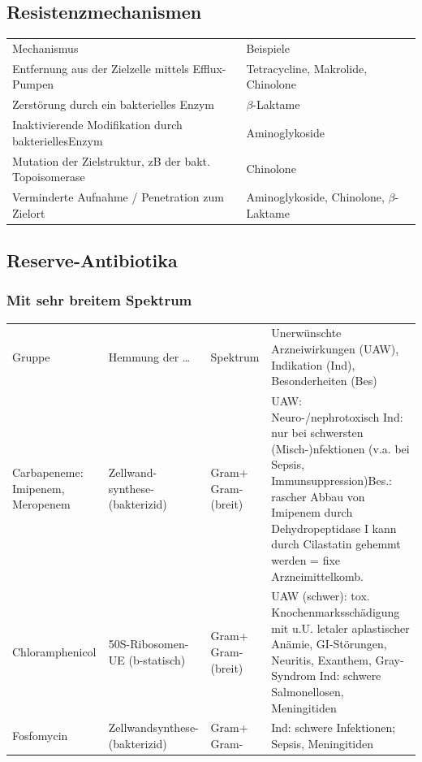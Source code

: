 \documentclass[10pt,a4paper]{report}
\begin{document}
\subsection{Resistenzmechanismen} %
\label{sub:subsection_name}
\begin{tabularx}{\textwidth}{lX}
Mechanismus&Beispiele\\
Entfernung aus der Zielzelle mittels Efflux-Pumpen&Tetracycline, Makrolide, Chinolone\\
Zerstörung durch ein bakterielles Enzym&$\beta$-Laktame\\
Inaktivierende Modifikation durch bakteriellesEnzym&Aminoglykoside\\
Mutation der Zielstruktur, zB der bakt. Topoisomerase&Chinolone\\
Verminderte Aufnahme / Penetration zum Zielort&Aminoglykoside, Chinolone, $\beta$-Laktame\\
\end{tabularx}
\subsection{Reserve-Antibiotika} %
\label{sub:reserve_antibiotika}
\subsubsection{Mit sehr breitem Spektrum} %
\label{ssub:mit_sehr_breitem_spektrum}
\begin{tabularx}{\textwidth}{XXlX}
Gruppe&Hemmung der …&Spektrum&Unerwünschte Arzneiwirkungen (UAW), Indikation (Ind), Besonderheiten (Bes) \\
Carbapeneme: Imipenem, Meropenem&Zellwand-synthese-(bakterizid)&Gram+ Gram-(breit)&UAW: Neuro-/nephrotoxisch Ind: nur bei schwersten (Misch-)nfektionen (v.a. bei Sepsis, Immunsuppression)Bes.: rascher Abbau von Imipenem durch Dehydropeptidase I kann durch Cilastatin gehemmt werden = fixe Arzneimittelkomb.\\
Chloramphenicol&50S-Ribosomen-UE (b-statisch)&Gram+ Gram- (breit)&UAW (schwer): tox. Knochenmarksschädigung mit u.U. letaler aplastischer Anämie, GI-Störungen, Neuritis, Exanthem, Gray-Syndrom Ind: schwere Salmonellosen, Meningitiden\\
Fosfomycin&Zellwandsynthese-(bakterizid)&Gram+ Gram-&Ind: schwere Infektionen; Sepsis, Meningitiden\\
\end{tabularx}
\end{document}
